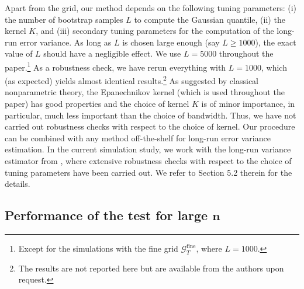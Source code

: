 \documentclass[12pt]{article}
\begin{document}
Apart from the grid, our method depends on the following tuning parameters: (i) the number of bootstrap samples $L$ to compute the Gaussian quantile, (ii) the kernel $K$, and (iii) secondary tuning parameters for the computation of the long-run error variance. 
As long as $L$ is chosen large enough (say $L \ge 1000$), the exact value of $L$ should have a negligible effect. We use $L=5000$ throughout the paper.\footnote{Except for the simulations with the fine grid $\mathcal{G}_T^{\text{fine}}$, where $L=1000$.} As a robustness check, we have rerun everything with $L=1000$, which (as expected) yields almost identical results.\footnote{The results are not reported here but are available from the authors upon request.} 
As suggested by classical nonparametric theory, the Epanechnikov kernel (which is used throughout the paper) has good properties and the choice of kernel $K$ is of minor importance, in particular, much less important than the choice of bandwidth. Thus, we have not carried out robustness checks with respect to the choice of kernel.
Our procedure can be combined with any method off-the-shelf for long-run error variance estimation. In the current simulation study, we work with the long-run variance estimator from \cite{KhismatullinaVogt2020}, where extensive robustness checks with respect to the choice of tuning parameters have been carried out. We refer to Section 5.2 therein for the details.


\subsection{Performance of the test for large $\boldsymbol{n}$}\label{subsec:sim:large_n}
\end{document}
